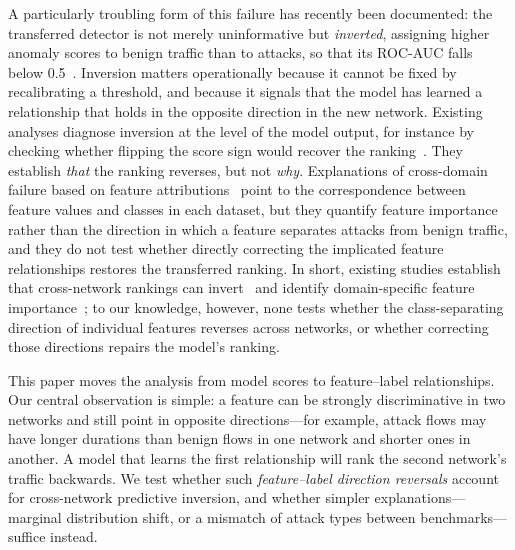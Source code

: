 \documentclass[preprint,12pt]{elsarticle}
\begin{document}
A particularly troubling form of this failure has recently been documented: the transferred detector is not merely uninformative but \emph{inverted}, assigning higher anomaly scores to benign traffic than to attacks, so that its ROC-AUC falls below 0.5~\cite{jin2026benchmark}. Inversion matters operationally because it cannot be fixed by recalibrating a threshold, and because it signals that the model has learned a relationship that holds in the opposite direction in the new network. Existing analyses diagnose inversion at the level of the model output, for instance by checking whether flipping the score sign would recover the ranking~\cite{jin2026benchmark}. They establish \emph{that} the ranking reverses, but not \emph{why}. Explanations of cross-domain failure based on feature attributions~\cite{layeghy2023explainable,sarhan2022evaluating} point to the correspondence between feature values and classes in each dataset, but they quantify feature importance rather than the direction in which a feature separates attacks from benign traffic, and they do not test whether directly correcting the implicated feature relationships restores the transferred ranking. In short, existing studies establish that cross-network rankings can invert~\cite{jin2026benchmark} and identify domain-specific feature importance~\cite{layeghy2023explainable,sarhan2022evaluating}; to our knowledge, however, none tests whether the class-separating direction of individual features reverses across networks, or whether correcting those directions repairs the model's ranking.

This paper moves the analysis from model scores to feature--label relationships. Our central observation is simple: a feature can be strongly discriminative in two networks and still point in opposite directions---for example, attack flows may have longer durations than benign flows in one network and shorter ones in another. A model that learns the first relationship will rank the second network's traffic backwards. We test whether such \emph{feature--label direction reversals} account for cross-network predictive inversion, and whether simpler explanations---marginal distribution shift, or a mismatch of attack types between benchmarks---suffice instead.
\end{document}
